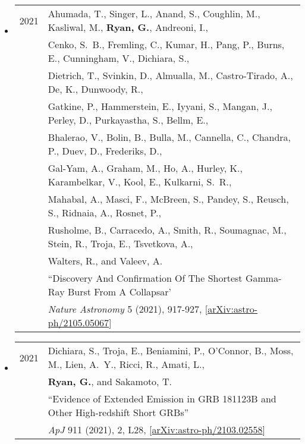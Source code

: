 \begin{itemize}
\item \begin{tabular}{ll}
2021 & {Ahumada}, T., {Singer}, L., {Anand}, S., {Coughlin}, M., {Kasliwal}, M., {\bf {Ryan}, G.}, {Andreoni}, I.,\\
	& {Cenko}, S.~B., {Fremling}, C., {Kumar}, H., {Pang}, P., {Burns}, E., {Cunningham}, V., {Dichiara}, S.,\\
	& {Dietrich}, T., {Svinkin}, D., {Almualla}, M., {Castro-Tirado}, A., {De}, K., {Dunwoody}, R., \\
	& {Gatkine}, P., {Hammerstein}, E., {Iyyani}, S., {Mangan}, J., {Perley}, D., {Purkayastha}, S., {Bellm}, E., \\
	& {Bhalerao}, V., {Bolin}, B., {Bulla}, M., {Cannella}, C., {Chandra}, P., {Duev}, D., {Frederiks}, D.,\\
	&  {Gal-Yam}, A., {Graham}, M., {Ho}, A., {Hurley}, K., {Karambelkar}, V., {Kool}, E., {Kulkarni}, S.~R.,\\
	&  {Mahabal}, A., {Masci}, F., {McBreen}, S., {Pandey}, S., {Reusch}, S., {Ridnaia}, A., {Rosnet}, P., \\
	& {Rusholme}, B., {Carracedo}, A., {Smith}, R., {Soumagnac}, M., {Stein}, R., {Troja}, E., {Tsvetkova}, A.,\\
	&  {Walters}, R., and {Valeev}, A.\\ 
	&``Discovery And Confirmation Of The Shortest Gamma-Ray Burst From A Collapsar'\\
	& \emph{Nature Astronomy} 5 (2021), 917-927, [\href{https://arxiv.org/abs/2105.05067}{arXiv:astro-ph/2105.05067}]\\
\end{tabular}	

\item \begin{tabular}{ll}
2021 & {Dichiara}, S., {Troja}, E., {Beniamini}, P., {O'Connor}, B., {Moss}, M., {Lien}, A.~Y., {Ricci}, R., {Amati}, L., \\
	& {\bf {Ryan}, G.}, and {Sakamoto}, T.\\
	& ``Evidence of Extended Emission in GRB 181123B and Other High-redshift Short GRBs''\\
	& \emph{ApJ} 911 (2021), 2, L28, [\href{https://arxiv.org/abs/2103.02558}{arXiv:astro-ph/2103.02558}]\\
\end{tabular}
	

\end{itemize}
